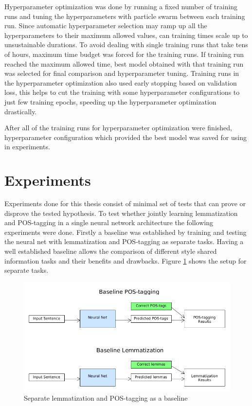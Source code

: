 \documentclass[12pt,a4paper,english
]{tutthesis}
\begin{document}
Hyperparameter optimization was done by running a fixed number of training runs and tuning the hyperparameters with particle swarm between each training run. Since automatic hyperparameter selection may ramp up all the hyperparameters to their maximum allowed values, can training times scale up to unsustainable durations. To avoid dealing with single training runs that take tens of hours, maximum time budget was forced for the training runs. If training run reached the maximum allowed time, best model obtained with that training run was selected for final comparison and hyperparameter tuning. Training runs in the hyperparameter optimization also used early stopping based on validation loss, this helps to cut the training with some hyperparameter configurations to just few training epochs, speeding up the hyperparameter optimization drastically.

After all of the training runs for hyperparameter optimization were finished, hyperparameter configuration which provided the best model was saved for using in experiments.

\section{Experiments}
\label{se:experiments}
Experiments done for this thesis consist of minimal set of tests that can prove or disprove the tested hypothesis. To test whether jointly learning lemmatization and POS-tagging in a single neural network architecture the following experiments were done. Firstly a baseline was established by training and testing the neural net with lemmatization and POS-tagging as separate tasks. Having a well established baseline allows the comparison of different style shared information tasks and their benefits and drawbacks. Figure \ref{figure:baseline_experiment} shows the setup for separate tasks.

\begin{figure}[htbp]
\caption{Separate lemmatization and POS-tagging as a baseline}
\label{figure:baseline_experiment}
\centering
\includegraphics[width=15cm]{baseline_experiment.png}
\end{figure}
\end{document}
